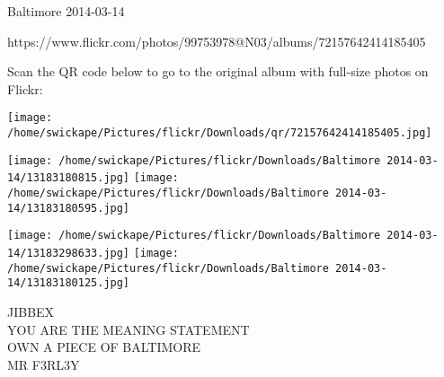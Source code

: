 \documentclass[10pt,letterpaper]{article}
\begin{document}
Baltimore 2014-03-14

https://www.flickr.com/photos/99753978@N03/albums/72157642414185405

Scan the QR code below to go to the original album with full-size photos on Flickr:

\texttt{[image: /home/swickape/Pictures/flickr/Downloads/qr/72157642414185405.jpg]}
\pagebreak

\texttt{[image: /home/swickape/Pictures/flickr/Downloads/Baltimore 2014-03-14/13183180815.jpg]}
\texttt{[image: /home/swickape/Pictures/flickr/Downloads/Baltimore 2014-03-14/13183180595.jpg]}

\texttt{[image: /home/swickape/Pictures/flickr/Downloads/Baltimore 2014-03-14/13183298633.jpg]}
\texttt{[image: /home/swickape/Pictures/flickr/Downloads/Baltimore 2014-03-14/13183180125.jpg]}

JIBBEX\\
YOU ARE THE MEANING STATEMENT\\
OWN A PIECE OF BALTIMORE\\
MR F3RL3Y
\pagebreak
\end{document}
